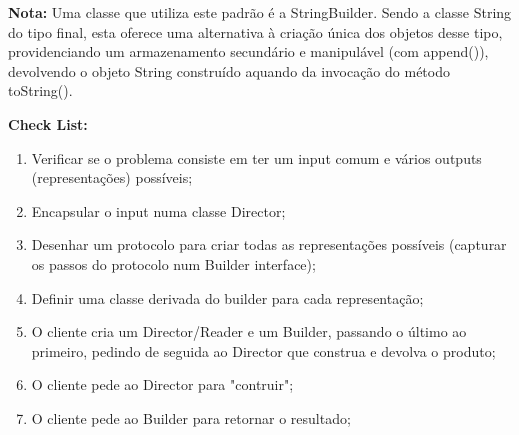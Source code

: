 \documentclass{article}
\begin{document}
\begin{flushleft}
    \textbf{Nota:} Uma classe que utiliza este padrão é a StringBuilder. Sendo a classe String do tipo final, esta oferece uma
    alternativa à criação única dos objetos desse tipo, providenciando um armazenamento secundário e
    manipulável (com append()), devolvendo o objeto String construído aquando da invocação do método
    toString().
\end{flushleft}

\pagebreak

\begin{flushleft}
    \textbf{Check List:}

    \begin{enumerate}
        \item Verificar se o problema consiste em ter um input comum e vários outputs
        (representações) possíveis;
        \item Encapsular o input numa classe Director;
        \item Desenhar um protocolo para criar todas as representações possíveis (capturar os passos do protocolo num Builder interface);
        \item Definir uma classe derivada do builder para cada representação;
        \item O cliente cria um Director/Reader e um Builder, passando o último ao primeiro,
        pedindo de seguida ao Director que construa e devolva o produto;
        \item O cliente pede ao Director para "contruir";
        \item O cliente pede ao Builder para retornar o resultado;
    \end{enumerate}
\end{flushleft}
\end{document}
